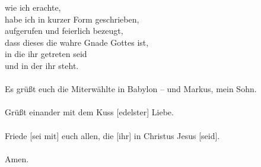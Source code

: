         wie ich erachte, \\
        habe ich in kurzer Form geschrieben, \\
        aufgerufen und feierlich bezeugt, \\
            dass dieses die wahre Gnade Gottes ist, \\
            in die ihr getreten seid \\
            und in der ihr steht. \\
\\
    Es grüßt euch die Miterwählte in Babylon – und Markus, mein Sohn. \\
\\
    Grüßt einander mit dem Kuss [edelster] Liebe. \\
\\
    Friede [sei mit] euch allen, die [ihr] in Christus Jesus [seid]. \\
\\
    Amen.
